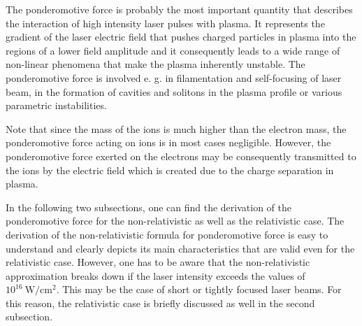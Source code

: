 The ponderomotive force is probably the most important quantity that describes the interaction of high intensity laser pulses with plasma. It represents the gradient of the laser electric field that pushes charged particles in plasma into the regions of a lower field amplitude and it consequently leads to a wide range of non-linear phenomena that make the plasma inherently unstable. The ponderomotive force is involved e. g. in filamentation and self-focusing of laser beam, in the formation of cavities and solitons in the plasma profile or various parametric instabilities.

Note that since the mass of the ions is much higher than the electron mass, the ponderomotive force acting on ions is in most cases negligible. However, the ponderomotive force exerted on the electrons may be consequently transmitted to the ions by the electric field which is created due to the charge separation in plasma.

In the following two subsections, one can find the derivation of the ponderomotive force for the non-relativistic as well as the relativistic case. The derivation of the non-relativistic formula for ponderomotive force is easy to understand and clearly depicts its main characteristics that are valid even for the relativistic case. However, one has to be aware that the non-relativistic approximation breaks down if the laser intensity exceeds the values of $ 10^{16} \ \mathrm{W/cm^2} $. This may be the case of short or tightly focused laser beams. For this reason, the relativistic case is briefly discussed as well in the second subsection.